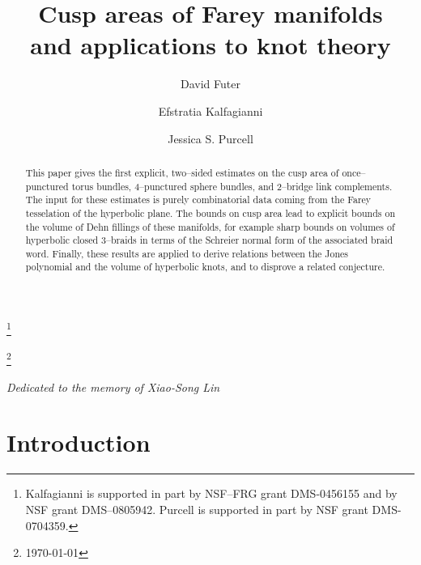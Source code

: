 \documentclass[11pt]{amsart}
\theoremstyle{plain}
\theoremstyle{definition}
\begin{document}
\title[Cusp areas of Farey manifolds]{Cusp areas of Farey manifolds \\
	and applications to knot theory}

\author[D. Futer]{David Futer}
\author[E. Kalfagianni]{Efstratia Kalfagianni}
\author[J. Purcell]{Jessica S. Purcell}

\address[]{Department of Mathematics, Temple University, Philadelphia, PA 19122, USA}


\address[]{Department of Mathematics, Michigan State University, East
Lansing, MI 48824, USA}



\address[]{ Department of Mathematics, Brigham Young University,
Provo, UT 84602, USA}



\thanks{{Kalfagianni is supported in part by NSF--FRG grant DMS-0456155 and by NSF
grant DMS--0805942. Purcell is supported in part by NSF grant
DMS-0704359.}}

\thanks{ \today}

\begin{abstract}
This paper gives the first explicit, two--sided estimates on the cusp area of 
once--punctured torus bundles, 4--punctured sphere bundles, and
2--bridge link complements. The input for these estimates is 
purely combinatorial data coming from the Farey tesselation of the hyperbolic plane.
  The bounds on cusp
area lead to explicit bounds on the volume of Dehn fillings of these
manifolds, for example 
sharp bounds on volumes of hyperbolic closed 3--braids in terms of the
Schreier normal form of the associated braid word.  Finally, these
results are applied to derive relations between the Jones polynomial
and the volume of hyperbolic knots, and to disprove a related
conjecture.  
\end{abstract}

\maketitle

\begin{flushright}
\emph{Dedicated to the memory of Xiao-Song Lin}
\end{flushright}

\section{Introduction}\label{sec:intro}
\end{document}
